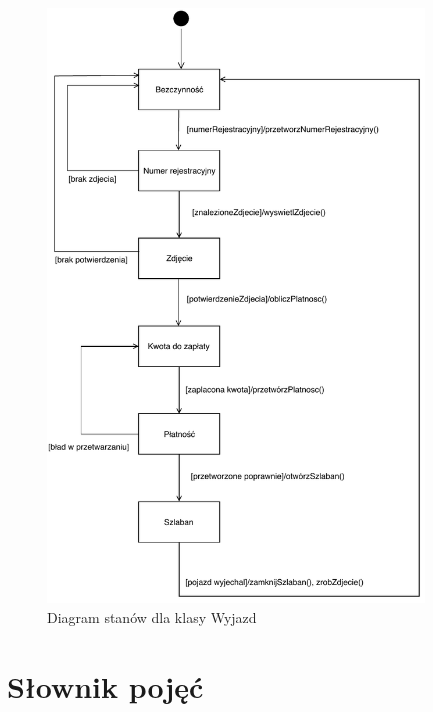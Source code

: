 \begin{figure}[H]
	\centering
	\includegraphics[width=100mm]{diagramy/DiagStanowWyjazd.pdf}
	\caption{Diagram stanów dla klasy Wyjazd \label{overflow}}
\end{figure}




\section{Słownik pojęć}
\label{sec:slownik}


